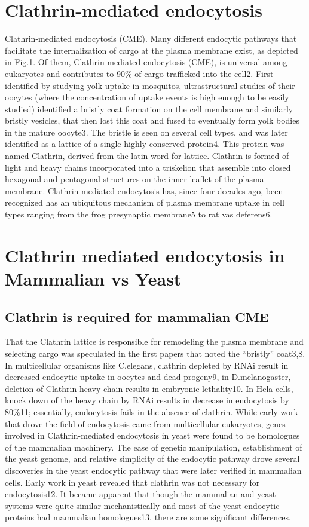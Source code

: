 \section{Clathrin-mediated endocytosis}
	Clathrin-mediated endocytosis (CME).
Many different endocytic pathways that facilitate the internalization of cargo at the plasma membrane exist, as depicted in Fig.1. Of them, Clathrin-mediated endocytosis (CME), is universal among eukaryotes and contributes to 90\% of cargo trafficked into the cell2. First identified by studying yolk uptake in mosquitos, ultrastructural studies of their oocytes (where the concentration of uptake events is high enough to be easily studied) identified a bristly coat formation on the cell membrane and similarly bristly vesicles, that then lost this coat and fused to eventually form yolk bodies in the mature oocyte3. The bristle is seen on several cell types, and was later identified as a lattice of a single highly conserved protein4. This protein was named Clathrin, derived from the latin word for lattice. Clathrin is formed of light and heavy chains incorporated into a triskelion that assemble into closed hexagonal and pentagonal structures on the inner leaflet of the plasma membrane. Clathrin-mediated endocytosis has, since four decades ago, been recognized has an ubiquitous mechanism of plasma membrane uptake in cell types ranging from the frog presynaptic membrane5 to rat vas deferens6. 

	
\section{Clathrin mediated endocytosis in Mammalian vs Yeast}
		\subsection{Clathrin is required for mammalian CME}
That the Clathrin lattice is responsible for remodeling the plasma membrane and selecting cargo was speculated in the first papers that noted the “bristly” coat3,8.  In multicellular organisms like C.elegans, clathrin depleted by RNAi result in decreased endocytic uptake in oocytes and dead progeny9, in D.melanogaster, deletion of Clathrin heavy chain results in embryonic lethality10. In Hela cells, knock down of the heavy chain by RNAi results in decrease in endocytosis by 80\%11; essentially, endocytosis fails in the absence of clathrin. While early work that drove the field of endocytosis came from multicellular eukaryotes, genes involved in Clathrin-mediated endocytosis in yeast were found to be homologues of the mammalian machinery. The ease of genetic manipulation, establishment of the yeast genome, and relative simplicity of the endocytic pathway drove several discoveries in the yeast endocytic pathway that were later verified in mammalian cells. Early work in yeast revealed that clathrin was not necessary for endocytosis12. It became apparent that though the mammalian and yeast systems were quite similar mechanistically and most of the yeast endocytic proteins had mammalian homologues13, there are some significant differences. 

